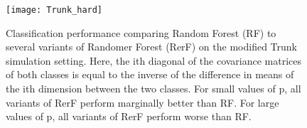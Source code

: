 \documentclass{article} %
\begin{document}
\begin{figure}[h]
\begin{center}
\texttt{[image: Trunk\_hard]}
\end{center}
\caption{Classification performance comparing Random Forest (RF) to several variants of Randomer Forest (RerF) on the modified Trunk simulation setting. Here, the ith diagonal of the covariance matrices of both classes is equal to the inverse of the difference in means of the ith dimension between the two classes. For small values of p, all variants of RerF perform marginally better than RF. For large values of p, all variants of RerF perform worse than RF.}
\end{figure}
\end{document}
